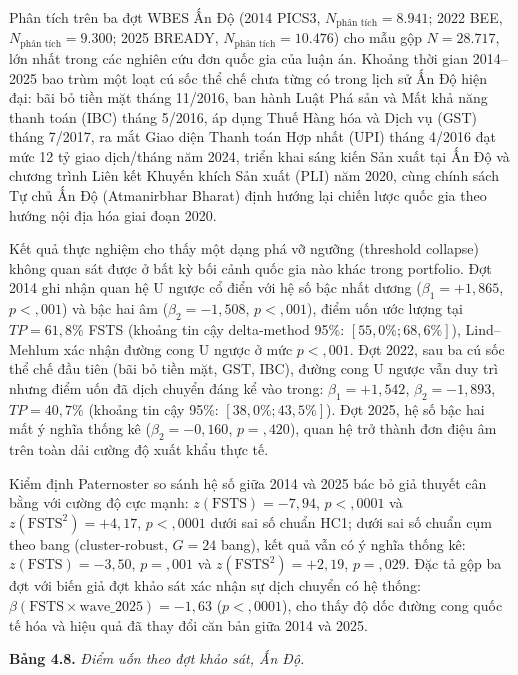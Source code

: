 \documentclass[
  a4paper,
  13pt]{extreport}
\begin{document}
Phân tích trên ba đợt WBES Ấn Độ (2014 PICS3,
\(N_{\text{phân tích}} = 8.941\); 2022 BEE,
\(N_{\text{phân tích}} = 9.300\); 2025 BREADY,
\(N_{\text{phân tích}} = 10.476\)) cho mẫu gộp \(N = 28.717\), lớn nhất
trong các nghiên cứu đơn quốc gia của luận án. Khoảng thời gian
2014--2025 bao trùm một loạt cú sốc thể chế chưa từng có trong lịch sử
Ấn Độ hiện đại: bãi bỏ tiền mặt tháng 11/2016, ban hành Luật Phá sản và
Mất khả năng thanh toán (IBC) tháng 5/2016, áp dụng Thuế Hàng hóa và
Dịch vụ (GST) tháng 7/2017, ra mắt Giao diện Thanh toán Hợp nhất (UPI)
tháng 4/2016 đạt mức 12 tỷ giao dịch/tháng năm 2024, triển khai sáng
kiến Sản xuất tại Ấn Độ và chương trình Liên kết Khuyến khích Sản xuất
(PLI) năm 2020, cùng chính sách Tự chủ Ấn Độ (Atmanirbhar Bharat) định
hướng lại chiến lược quốc gia theo hướng nội địa hóa giai đoạn 2020.

Kết quả thực nghiệm cho thấy một dạng phá vỡ ngưỡng (threshold collapse)
không quan sát được ở bất kỳ bối cảnh quốc gia nào khác trong portfolio.
Đợt 2014 ghi nhận quan hệ U ngược cổ điển với hệ số bậc nhất dương
(\(\beta_1 = +1{,}865\), \(p < {,}001\)) và bậc hai âm
(\(\beta_2 = -1{,}508\), \(p < {,}001\)), điểm uốn ước lượng tại
\(TP = 61{,}8\%\) FSTS (khoảng tin cậy delta-method 95\%:
\([55{,}0\%; 68{,}6\%]\)), Lind--Mehlum xác nhận đường cong U ngược ở
mức \(p < {,}001\). Đợt 2022, sau ba cú sốc thể chế đầu tiên (bãi bỏ
tiền mặt, GST, IBC), đường cong U ngược vẫn duy trì nhưng điểm uốn đã
dịch chuyển đáng kể vào trong: \(\beta_1 = +1{,}542\),
\(\beta_2 = -1{,}893\), \(TP = 40{,}7\%\) (khoảng tin cậy 95\%:
\([38{,}0\%; 43{,}5\%]\)). Đợt 2025, hệ số bậc hai mất ý nghĩa thống kê
(\(\beta_2 = -0{,}160\), \(p = {,}420\)), quan hệ trở thành đơn điệu âm
trên toàn dải cường độ xuất khẩu thực tế.

Kiểm định Paternoster so sánh hệ số giữa 2014 và 2025 bác bỏ giả thuyết
cân bằng với cường độ cực mạnh: \(z(\text{FSTS}) = -7{,}94\),
\(p < {,}0001\) và \(z(\text{FSTS}^2) = +4{,}17\), \(p < {,}0001\) dưới
sai số chuẩn HC1; dưới sai số chuẩn cụm theo bang (cluster-robust,
\(G = 24\) bang), kết quả vẫn có ý nghĩa thống kê:
\(z(\text{FSTS}) = -3{,}50\), \(p = {,}001\) và
\(z(\text{FSTS}^2) = +2{,}19\), \(p = {,}029\). Đặc tả gộp ba đợt với
biến giả đợt khảo sát xác nhận sự dịch chuyển có hệ thống:
\(\beta(\text{FSTS} \times \text{wave}\_2025) = -1{,}63\)
(\(p < {,}0001\)), cho thấy độ dốc đường cong quốc tế hóa và hiệu quả đã
thay đổi căn bản giữa 2014 và 2025.

\textbf{Bảng 4.8.} \emph{Điểm uốn theo đợt khảo sát, Ấn Độ.}
\end{document}
